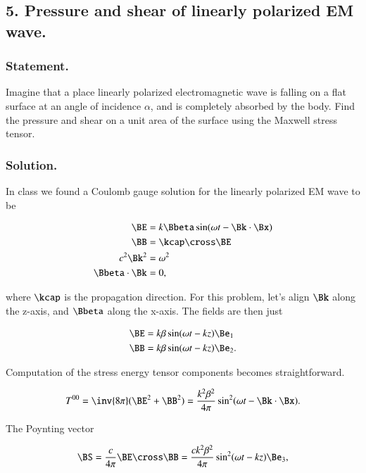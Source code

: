 \subsection{5. Pressure and shear of linearly polarized EM wave.}

\subsubsection{Statement.}

Imagine that a place linearly polarized electromagnetic wave is falling on a flat surface at an angle of incidence $\alpha$, and is completely absorbed by the body.  Find the pressure and shear on a unit area of the surface using the Maxwell stress tensor.

\subsubsection{Solution.}

In class we found a Coulomb gauge solution for the linearly polarized EM wave to be

\begin{align}\label{eqn:relativisticElectrodynamicsPS6P1:400}
\BE &= k \Bbeta \sin( \omega t - \Bk \cdot \Bx ) \\
\BB &= \kcap \cross \BE \\
c^2 \Bk^2 &= \omega^2 \\
\Bbeta \cdot \Bk &= 0,
\end{align}

where $\kcap$ is the propagation direction.  For this problem, let's align $\Bk$ along the z-axis, and $\Bbeta$ along the x-axis.  The fields are then just

\begin{align}\label{eqn:relativisticElectrodynamicsPS6P1:420}
\BE &= k \beta \sin( \omega t - k z ) \Be_1 \\
\BB &= k \beta \sin( \omega t - k z ) \Be_2.
\end{align}

Computation of the stress energy tensor components becomes straightforward.

\begin{equation}\label{eqn:relativisticElectrodynamicsPS6P1:440}
T^{0 0} = \inv{8 \pi} (\BE^2 + \BB^2) = \frac{k^2 \beta^2}{4 \pi} \sin^2(\omega t - \Bk \cdot \Bx).
\end{equation}

The Poynting vector

\begin{equation}\label{eqn:relativisticElectrodynamicsPS6P1:460}
\BS = \frac{c}{4 \pi} \BE \cross \BB = \frac{c k^2 \beta^2}{4 \pi} \sin^2(\omega t - k z) \Be_3,
\end{equation}

